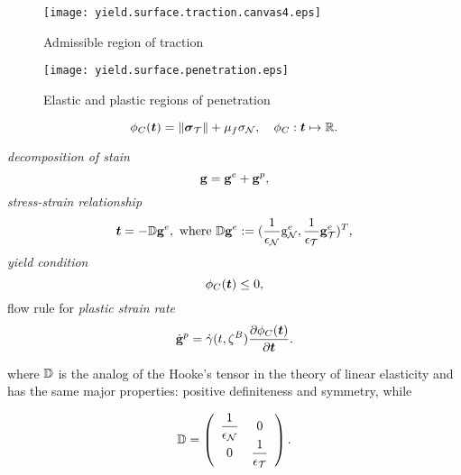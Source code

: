 \documentclass[12pt,a4paper]{scrbook}
\begin{document}
\begin{figure}[h]
\begin{minipage}{7cm}
\begin{center}
\texttt{[image: yield.surface.traction.canvas4.eps]}\end{center}
\caption{Admissible region  of traction}\label{TractionAdmissibeRegion}
\end{minipage}
\begin{minipage}{7cm}
\begin{center}
\texttt{[image: yield.surface.penetration.eps]}\end{center}
\caption{Elastic and plastic  regions of penetration}\label{PenetrationAdmissibeRegion}
\end{minipage}
\end{figure}


\begin{equation}
 \phi_{C}(\mbox{\boldmath$t$})=\|\mbox{\boldmath$\sigma$}_{{\mathcal{T}}}\|+\mu_{f}\sigma_{{\mathcal{N}}},\quad \phi_{C}: \mbox{\boldmath$t$}\mapsto {\mathbb R}.
\end{equation}


\textit{decomposition of stain} 
\begin{equation}\label{eq:Contact:StrainDecomposition}
\mbox{\boldmath$\mathrm{g}$}=\mbox{\boldmath$\mathrm{g}$}^e+\mbox{\boldmath$\mathrm{g}$}^p,
\end{equation}
\textit{stress-strain relationship} 
\begin{equation}\label{eq:Contact:StressStrainRelationship}
\mbox{\boldmath$t$}=-{\mathbb D} \mbox{\boldmath$\mathrm{g}$}^e, \mbox{ where } {\mathbb D} \mbox{\boldmath$\mathrm{g}$}^e:=(\dfrac{1}{\epsilon_{{\mathcal{N}}}}\mathrm{g}_{{\mathcal{N}}}^e,\dfrac{1}{\epsilon_{{\mathcal{T}}}}\mbox{\boldmath$\mathrm{g}$}_{{\mathcal{T}}}^e)^T,
\end{equation}
\textit{yield condition} 
\begin{equation}\label{eq:Contact:YieldCondition}
\phi_{C}(\mbox{\boldmath$t$})\leq 0,
\end{equation}
flow rule for \textit{plastic strain rate} 
\begin{equation}\label{eq:Contact:FlowRule}
\dot{\mbox{\boldmath$\mathrm{g}$}}^p=\dot{\gamma}(t,\zeta^{B}) \dfrac{\partial \phi_{C}(\mbox{\boldmath$t$})}{\partial \mbox{\boldmath$t$}}.
\end{equation}

where ${\mathbb D}$ is the analog of the Hooke's tensor in the theory of linear elasticity  and has the same major properties: positive definiteness and symmetry, while

\begin{equation}\label{ContactHooksTensorDef}
{\mathbb D} =\left(\begin{array}{cc}
\dfrac{1}{\epsilon_{{\mathcal{N}}}} & 0\\
0 & \dfrac{1}{\epsilon_{{\mathcal{T}}}}
\end{array}\right).
\end{equation}
\end{document}
